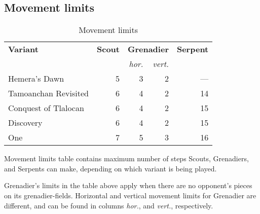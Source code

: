 \clearpage %

\subsection*{Movement limits}
\label{sec:Appendix/Summary/Movement limits}

\begin{table}[!h]
\centering
\begin{tabular}{ lrrrr }
\toprule %
\textbf{Variant}      & \textbf{Scout}  & \multicolumn{2}{c}{ \textbf{Grenadier} }  & \textbf{Serpent}  \\
                                        \cmidrule{3-4} %
                      &                 &       \emph{hor.} &          \emph{vert.} &                   \\
\midrule %
Hemera's Dawn         &               5 &                 3 &                     2 &               --- \\
Tamoanchan Revisited  &               6 &                 4 &                     2 &                14 \\
Conquest of Tlalocan  &               6 &                 4 &                     2 &                15 \\
Discovery             &               6 &                 4 &                     2 &                15 \\
One                   &               7 &                 5 &                     3 &                16 \\
\bottomrule %
\end{tabular}
\caption{Movement limits}
\label{tbl:Appendix/Summary/Movement limits}
\end{table}

Movement limits table contains maximum number of steps Scouts, Grenadiers, and
Serpents can make, depending on which variant is being played.

Grenadier's limits in the table above apply when there are no opponent's pieces
on its grenadier-fields. Horizontal and vertical movement limits for Grenadier
are different, and can be found in columns \emph{hor.}, and \emph{vert.},
respectively.

